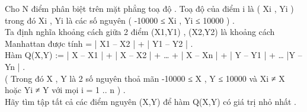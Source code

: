 Cho N điểm phân biệt trên mặt phẳng toạ độ . Toạ độ của điểm i là ( Xi , Yi ) trong đó Xi , Yi là các số nguyên ( -10000 ≤ Xi , Yi ≤ 10000 ) .   
\\   Ta định nghĩa khoảng cách giữa 2 điểm (X1,Y1) , (X2,Y2) là khoảng cách Manhattan được tính = | X1 – X2 | + | Y1 – Y2 | .   
\\   Hàm Q(X,Y) := | X – X1 | + | X – X2 | + … + | X – Xn | + | Y – Y1 | + … |Y – Yn | .   
\\   ( Trong đó X , Y là 2 số nguyên thoả mãn -10000 ≤ X , Y ≤ 10000 và Xi ≠ X hoặc Yi ≠ Y với mọi i = 1 .. n  ) .   
\\   Hãy tìm tập tất cả các điểm nguyên (X,Y) để hàm Q(X,Y) có giá trị nhỏ nhất .